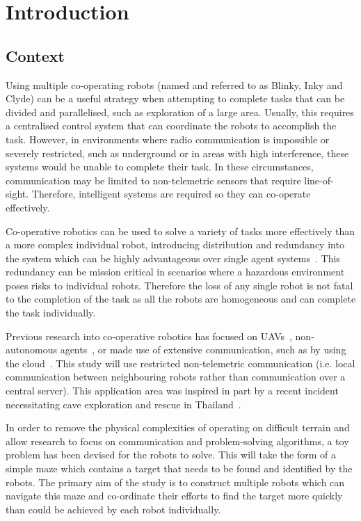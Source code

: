 
\chapter{Introduction}\label{introduction}
\section{Context}\label{introduction/context}
Using multiple co-operating robots (named and referred to as Blinky, Inky
and Clyde) can be a useful strategy when attempting to complete tasks that
can be divided and parallelised, such as exploration of a large area.
Usually, this requires a centralised control system that can
coordinate the robots to accomplish the task. However, in
environments where radio communication is impossible or severely restricted,
such as underground or in areas with high interference, these systems would
be unable to complete their task. In these circumstances, communication may
be limited to non-telemetric sensors that require line-of-sight. Therefore,
intelligent systems are required so they can co-operate effectively.

Co-operative robotics can be used to solve a variety of tasks more 
effectively than a more complex individual robot, introducing distribution
and redundancy into the system which can be highly advantageous over single 
agent systems~\cite{dudek96}. This redundancy can be mission critical in 
scenarios where a hazardous environment poses risks to individual robots. 
Therefore the loss of any single robot is not fatal to the completion  of the task as all
the robots are homogeneous and can complete the task individually.

Previous research into co-operative robotics has focused on UAVs~\cite{khan18},
non-autonomous agents~\cite{jimenez18}, or made use of extensive
communication, such as by using the cloud~\cite{wensing2018cooperative}.
This study will use restricted non-telemetric communication (i.e. local 
communication between neighbouring robots rather than communication over a 
central server). This
application area was inspired in part by a recent incident necessitating cave 
exploration and rescue in Thailand~\cite{bbcthailand}.

In order to remove the physical complexities of operating on difficult
terrain and allow research to focus on communication and problem-solving 
algorithms, a toy problem has been devised for the robots to solve. This
will take the form of a simple maze which contains a target that needs to
be found and identified by the robots. The primary aim of the study is to
construct multiple robots which can navigate this maze and co-ordinate their
efforts to find the target more quickly than could be achieved by each robot 
individually.

